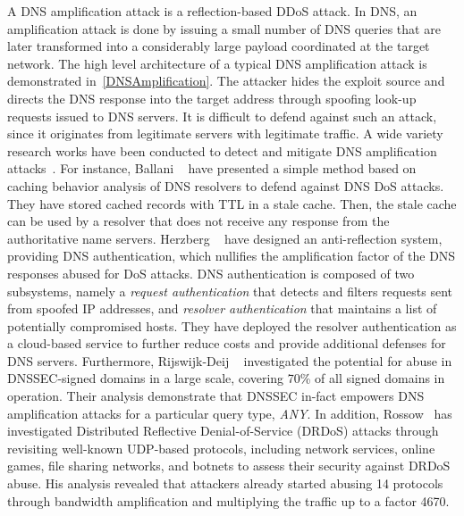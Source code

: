 \label{sec:Amplification}
A DNS amplification attack is a reflection-based DDoS attack. In DNS, an amplification attack is done by issuing a small number of DNS queries that are later  transformed into a considerably large payload coordinated at the target network. The high level architecture of a typical DNS amplification attack is demonstrated in~\autoref{DNSAmplification}. The attacker hides the exploit source and directs the DNS response into the target address through spoofing look-up requests issued to DNS servers. It is difficult to defend against such an attack, since it originates from legitimate servers with legitimate traffic. 
A wide variety research works have been conducted to detect and mitigate DNS amplification attacks~. For instance, Ballani \etal~ have presented a simple method based on caching behavior analysis of DNS resolvers to defend against DNS DoS attacks. They have stored cached records with TTL in a stale cache. Then, the stale cache can be used by a resolver that does not receive any response from the authoritative name servers.
Herzberg \etal~ have designed an anti-reflection system, providing DNS authentication, which nullifies the amplification factor of the DNS responses abused for DoS attacks. DNS authentication is composed of two subsystems, namely a {\em request authentication} that detects and filters requests sent from spoofed IP addresses, and {\em resolver authentication} that maintains a list of potentially compromised hosts. They have deployed the resolver authentication as a cloud-based service to further reduce costs and provide additional defenses for DNS servers. 
Furthermore, Rijswijk-Deij \etal~ investigated the potential for abuse in DNSSEC-signed domains in a large scale, covering 70\% of all signed domains in operation. Their analysis demonstrate that DNSSEC in-fact empowers DNS amplification attacks for a particular query type, \textit{ANY}. In addition, Rossow~ has investigated Distributed Reflective Denial-of-Service (DRDoS) attacks through revisiting well-known UDP-based protocols, including network services, online games, file sharing networks, and botnets to assess their security against DRDoS abuse. His analysis revealed that attackers already started abusing 14 protocols through bandwidth amplification and multiplying the traffic up to a factor 4670.
